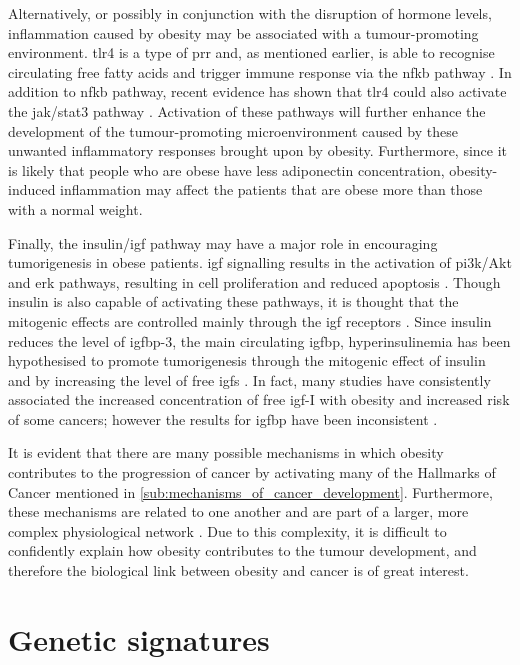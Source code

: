 Alternatively, or possibly in conjunction with the disruption of hormone levels, inflammation caused by obesity may be associated with a tumour-promoting environment.
\Gls{tlr}4 is a type of \gls{prr} and, as mentioned earlier, is able to recognise circulating free fatty acids and trigger immune response via the \gls{nfkb} pathway \citep{Lumeng2011}.
In addition to \gls{nfkb} pathway, recent evidence has shown that \gls{tlr}4 could also activate the \gls{jak}/\gls{stat3} pathway \citep{Yu2014}.
Activation of these pathways will further enhance the development of the tumour-promoting microenvironment caused by these unwanted inflammatory responses brought upon by obesity.
Furthermore, since it is likely that people who are obese have less adiponectin concentration, obesity-induced inflammation may affect the patients that are obese more than those with a normal weight.

Finally, the insulin/\gls{igf} pathway may have a major role in encouraging tumorigenesis in obese patients.
\gls{igf} signalling results in the activation of \gls{pi3k}/Akt and \gls{erk} pathways, resulting in cell proliferation and reduced apoptosis \citep{Roberts2010}.
Though insulin is also capable of activating these pathways, it is thought that the mitogenic effects are controlled mainly through the \gls{igf} receptors \citep{Roberts2010}.
Since insulin reduces the level of \gls{igfbp}-3, the main circulating \gls{igfbp}, hyperinsulinemia has been hypothesised to promote tumorigenesis through the mitogenic effect of insulin and by increasing the level of free \glspl{igf} \citep{Giovannucci1995,Mckeown1994,Roberts2010}.
In fact, many studies have consistently associated the increased concentration of free \gls{igf}-I with obesity and increased risk of some cancers; however the results for \gls{igfbp} have been inconsistent \citep{Basen2011}.

It is evident that there are many possible mechanisms in which obesity contributes to the progression of cancer by activating many of the Hallmarks of Cancer mentioned in \cref{sub:mechanisms_of_cancer_development}.
Furthermore, these mechanisms are related to one another and are part of a larger, more complex physiological network \citep{Renehan2006}.
Due to this complexity, it is difficult to confidently explain how obesity contributes to the tumour development, and therefore the biological link between obesity and cancer is of great interest.

\section{Genetic signatures}
\label{sec:genetic_signatures}

